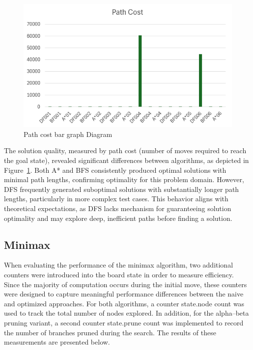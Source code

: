 \documentclass[journal]{./IEEE/IEEEtran}
\begin{document}
\begin{figure}[H]
    \centering
    \includegraphics[width=1\linewidth]{pictures-Clarence/path cost bar graph.png}
    \caption{Path cost bar graph Diagram}
    \label{fig:path_cost_bar_graph}
\end{figure}
The solution quality, measured by path cost (number of moves required to reach the goal state), revealed significant differences between algorithms, as depicted in Figure~\ref{fig:path_cost_bar_graph}. Both A* and BFS consistently produced optimal solutions with minimal path lengths, confirming optimality for this problem domain. However, DFS frequently generated suboptimal solutions with substantially longer path lengths, particularly in more complex test cases. This behavior aligns with theoretical expectations, as DFS lacks mechanism for guaranteeing solution optimality and may explore deep, inefficient paths before finding a solution.

\subsection{Minimax}
When evaluating the performance of the minimax algorithm, two additional counters were introduced into the board state in order to measure efficiency. Since the majority of computation occurs during the initial move, these counters were designed to capture meaningful performance differences between the naive and optimized approaches. For both algorithms, a counter state.node count was used to track the total number of nodes explored. In addition, for the alpha–beta pruning variant, a second counter state.prune count was implemented to record the number of branches pruned during the search. The results of these measurements are presented below.
\end{document}
